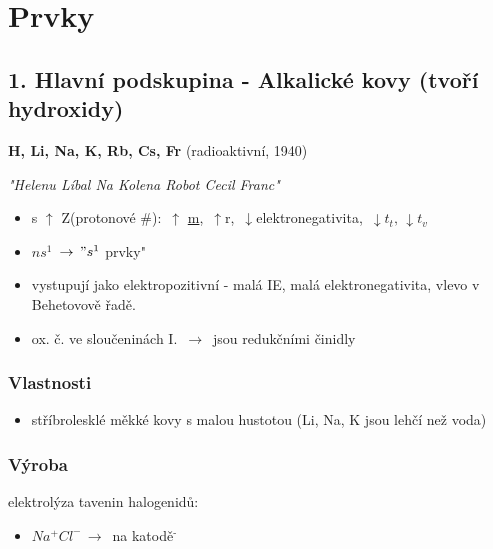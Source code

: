     
\TabPositions{0em, 20em}
\section{Prvky}
\subsection{1. Hlavní podskupina - Alkalické kovy (tvoří hydroxidy)}
\textbf{H, Li, Na, K, Rb, Cs, Fr} (radioaktivní, 1940)

\textit{"Helenu Líbal Na Kolena Robot Cecil Franc"}
    \begin{itemize}
        \item s $\uparrow$ Z(protonové \#): $\, \uparrow$ \underline{m}, $\, \uparrow$r, $\, \downarrow$elektronegativita, $\, \downarrow t_t, \, \downarrow t_v$
        \item $ns^1$ \fbox{$\downarrow$} $\,\to\, "s^1$ prvky"
        
        \item vystupují jako elektropozitivní - malá IE, malá elektronegativita, vlevo v Behetovově řadě.
        \item ox. č. ve sloučeninách I. $\,\to\,$ jsou redukčními činidly
    \end{itemize}
    \subsubsection{Vlastnosti}
        \begin{itemize}
            \item stříbrolesklé měkké kovy s malou hustotou (Li, Na, K jsou lehčí než voda)
        \end{itemize}
    \subsubsection{Výroba}
        elektrolýza tavenin halogenidů:
        \begin{itemize}
            \item $Na^+Cl^-\,\to\,$ na katodě$^{\textbf{-}}$
        \end{itemize}
